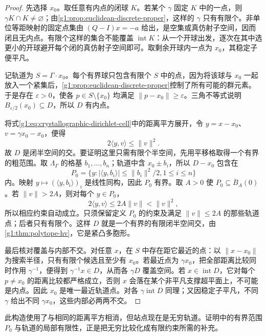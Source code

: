 \begin{proof}
	先选择 \(x_0\)。取任意有内点的闭球 \(K\)。若某个 \(\gamma\) 固定 \(K\) 中的一点，则 \(\gamma K\cap K\ne\varnothing\)；由\cref{g1:prop:euclidean-discrete-proper}，这样的 \(\gamma\) 只有有限个。非单位等距映射的固定点集由 \((Q-I)x=-a\) 给出，是空集或真仿射子空间，因而闭且无内点。有限个这样的集合不能覆盖 \(\operatorname{int}K\)：从一个开球出发，逐次在其中选更小的开球避开每个闭的真仿射子空间即可。取剩余开球内一点为 \(x_0\)，其稳定子便平凡。

	记轨道为 \(S=\Gamma\cdot x_0\)。每个有界球只包含有限个 \(S\) 中的点，因为将该球与 \(x_0\) 一起放入一个紧集后，\cref{g1:prop:euclidean-discrete-proper}控制了所有可能的群元素。于是存在 \(\varepsilon>0\)，使各 \(p\in S\setminus\{x_0\}\) 均满足 \(\lVert p-x_0\rVert\ge\varepsilon\)。三角不等式说明 \(B_{\varepsilon/2}(x_0)\subseteq D\)，所以 \(D\) 有内点。

	将式\eqref{g1:eq:crystallographic-dirichlet-cell}中的距离平方展开，令 \(y=x-x_0\)、\(v=\gamma x_0-x_0\)，便得
	\[
		2\langle y,v\rangle\le\lVert v\rVert^2.
	\]
	故 \(D\) 是闭半空间的交。要证明这里只需有限个半空间，先用平移格取得一个有界的粗范围。取 \(\Lambda_\Gamma\) 的格基 \(b_1,\ldots,b_n\)；轨道中含 \(x_0\pm b_i\)，所以 \(D-x_0\) 包含在
	\[
		P_0=\{y:|\langle y,b_i\rangle|\le\lVert b_i\rVert^2/2, 1\le i\le n\}
	\]
	内。映射 \(y\mapsto(\langle y,b_i\rangle)_i\) 是线性同构，因此 \(P_0\) 有界。取 \(A>0\) 使 \(P_0\subseteq\overline B_A(0)\)。若 \(\lVert v\rVert>2A\)，则对每个 \(y\in P_0\)，
	\[
		2\langle y,v\rangle\le2A\lVert v\rVert<\lVert v\rVert^2,
	\]
	所以相应约束自动成立。只须保留定义 \(P_0\) 的约束及满足 \(\lVert v\rVert\le2A\) 的那些轨道点；后者只有有限个。这样 \(D\) 就是一个有界的有限闭半空间交，由\cref{g1:thm:polytope-hv}，它是紧凸多胞形。

	最后核对覆盖与内部不交。对任意 \(x\)，在 \(S\) 中存在距它最近的点：以 \(\lVert x-x_0\rVert\) 为搜索半径，只有有限个候选且至少有 \(x_0\)。若最近点为 \(\gamma x_0\)，把全部距离比较同时作用 \(\gamma^{-1}\)，便得到 \(\gamma^{-1}x\in D\)，从而各 \(\gamma D\) 覆盖空间。若 \(x\in\operatorname{int}D\)，它对每个 \(p\ne x_0\) 的距离比较都严格成立，否则 \(x\) 会落在某个非平凡支撑超平面上，不可能是内点。因此 \(x_0\) 是唯一最近轨道点。对各 \(\gamma\operatorname{int}D\) 同理；又因稳定子平凡，不同 \(\gamma\) 给出不同 \(\gamma x_0\)，这些内部必两两不交。
\end{proof}

此构造使用了与相同的距离平方相消，但站点现在是无穷轨道。证明中的有界范围 \(P_0\) 与轨道的局部有限性，正是把无穷比较化成有限约束所需的补充。

